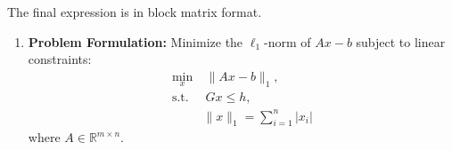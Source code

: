 \begin{warning}
    The final expression is in block matrix format.
\end{warning}

\begin{example}
    \begin{enumerate}
        \item \textbf{Problem Formulation:}
        Minimize the \( \ell_1 \)-norm of \( A x - b \) subject to linear constraints:
        \begin{align*}
            \min_x & \ \|A x - b\|_1, \\
            \text{s.t.} & \ G x \leq h, \\
            & \|x\|_1 = \sum_{i=1}^n |x_i| 
        \end{align*}
        where \( A \in \mathbb{R}^{m \times n} \).
    

\end{enumerate}
\end{example}
